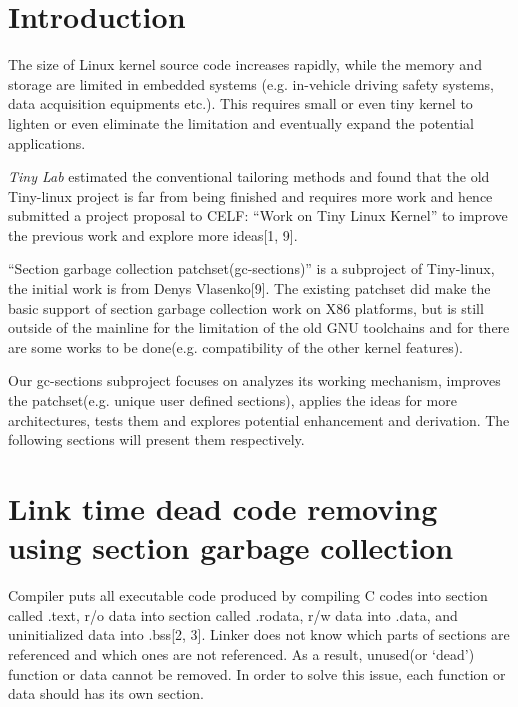 \documentclass[10pt,a4paper]{article}
\begin{document}
\begin{multicols}{2}

\section{Introduction}

The size of Linux kernel source code increases rapidly, while the memory and
storage are limited in embedded systems (e.g. in-vehicle driving safety
systems, data acquisition equipments etc.). This requires small or even tiny
kernel to lighten or even eliminate the limitation and eventually expand the
potential applications.

{\em Tiny Lab} estimated the conventional tailoring methods and found that the
old Tiny-linux project is far from being finished and requires more work and
hence submitted a project proposal to CELF: ``Work on Tiny Linux Kernel'' to
improve the previous work and explore more ideas[1, 9].

``Section garbage collection patchset(gc-sections)'' is a subproject of
Tiny-linux, the initial work is from Denys Vlasenko[9]. The existing patchset
did make the basic support of section garbage collection work on X86 platforms,
but is still outside of the mainline for the limitation of the old GNU
toolchains and for there are some works to be done(e.g. compatibility of the
other kernel features).

Our gc-sections subproject focuses on analyzes its working mechanism, improves
the patchset(e.g. unique user defined sections), applies the ideas for more
architectures, tests them and explores potential enhancement and derivation.
The following sections will present them respectively.

\section{Link time dead code removing using section garbage collection}

Compiler puts all executable code produced by compiling C codes into section
called .text, r/o data into section called .rodata, r/w data into .data, and
uninitialized data into .bss[2, 3]. Linker does not know which parts of
sections are referenced and which ones are not referenced. As a result,
unused(or `dead') function or data cannot be removed. In order to solve this
issue, each function or data should has its own section.


\end{multicols}
\end{document}
